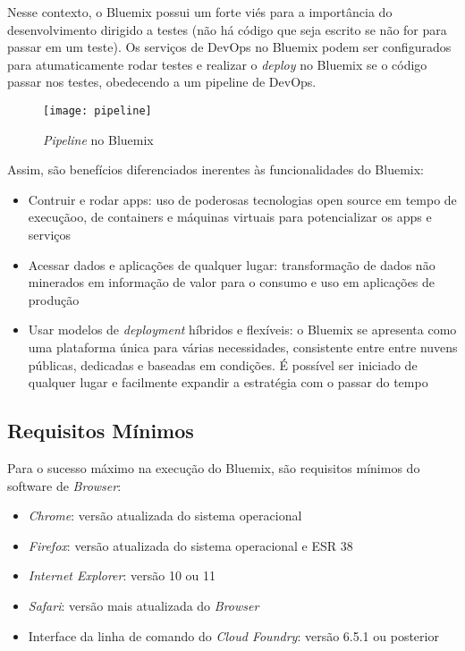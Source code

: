 Nesse contexto, o Bluemix possui um forte viés para a importância do desenvolvimento dirigido a testes (não há código que seja escrito se não for para passar em um teste). Os serviços de DevOps no Bluemix podem ser configurados para atumaticamente rodar testes e realizar o \textit{deploy} no Bluemix se o código passar nos testes, obedecendo a um pipeline de DevOps.
\begin{figure}[!htb]
    \centering
    \texttt{[image: pipeline]}
    \caption{\textit{Pipeline} no Bluemix}
    \label{Rotulo}
\end{figure}

Assim, são benefícios diferenciados inerentes às funcionalidades do Bluemix:
\begin{itemize}
    \item	Contruir e rodar apps: uso de poderosas tecnologias open source em tempo de execuçãoo, de containers e máquinas virtuais para potencializar os apps e serviços
    \item	Acessar dados e aplicações de qualquer lugar: transformação de dados não minerados em informação de valor para o consumo e uso em aplicações de produção
    \item	Usar modelos de \textit{deployment} híbridos e flexíveis: o Bluemix se apresenta como uma plataforma única para várias necessidades, consistente entre entre nuvens públicas, dedicadas e baseadas em condições. É possível ser iniciado de qualquer lugar e facilmente expandir a estratégia com o passar do tempo
\end{itemize}

\subsection{Requisitos Mínimos}

Para o sucesso máximo na execução do Bluemix, são requisitos mínimos do software de \textit{Browser}:
\begin{itemize}
    \item	\textit{Chrome}: versão atualizada do sistema operacional
    \item	\textit{Firefox}: versão atualizada do sistema operacional e ESR 38
    \item	\textit{Internet Explorer}: versão 10 ou 11
    \item	\textit{Safari}: versão mais atualizada do \textit{Browser}
    \item	Interface da linha de comando do \textit{Cloud Foundry}: versão 6.5.1 ou posterior
\end{itemize}

